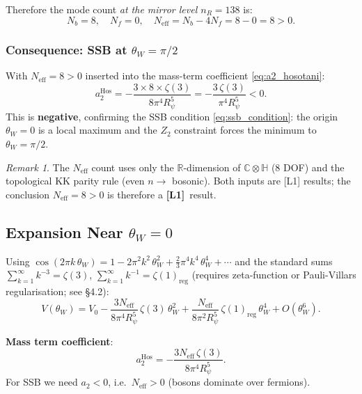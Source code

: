 \documentclass[12pt]{article}
\theoremstyle{definition}
\theoremstyle{remark}
\newtheorem{remark}[theorem]{Remark}
\newcommand{\Lone}{\textbf{[L1]}}
\begin{document}
Therefore the mode count \emph{at the mirror level $n_R = 138$} is:
\begin{equation}
  \label{eq:neff_count}
  \boxed{N_b = 8,\quad N_f = 0,\quad
  N_{\text{eff}} = N_b - 4N_f = 8 - 0 = 8 > 0.}
\end{equation}

\subsubsection{Consequence: SSB at $\theta_W = \pi/2$}

With $N_{\text{eff}} = 8 > 0$ inserted into the mass-term coefficient
\eqref{eq:a2_hosotani}:
\begin{equation}
  a_2^{\text{Hos}} = -\frac{3 \times 8 \times \zeta(3)}{8\pi^4 R_\psi^5}
                   = -\frac{3\,\zeta(3)}{\pi^4 R_\psi^5} < 0.
\end{equation}
This is \textbf{negative}, confirming the SSB condition
\eqref{eq:ssb_condition}: the origin $\theta_W = 0$ is a local
maximum and the $Z_2$ constraint forces the minimum to
$\theta_W = \pi/2$.

\begin{remark}
The $N_{\text{eff}}$ count uses only the $\mathbb{R}$-dimension of
$\mathbb{C}\otimes\mathbb{H}$ (8 DOF) and the topological KK parity
rule (even $n \to$ bosonic).  Both inputs are [L1] results;
the conclusion $N_{\text{eff}} = 8 > 0$ is therefore a \Lone\ result.
\end{remark}

\subsection{Expansion Near $\theta_W = 0$}

Using $\cos(2\pi k\,\theta_W) = 1 - 2\pi^2 k^2\,\theta_W^2
+ \tfrac{2}{3}\pi^4 k^4\,\theta_W^4 + \cdots$ and the standard sums
$\sum_{k=1}^\infty k^{-3} = \zeta(3)$,
$\sum_{k=1}^\infty k^{-1} = \zeta(1)_{\text{reg}}$ (requires
zeta-function or Pauli-Villars regularisation; see §4.2):
\begin{equation}
  V(\theta_W) = V_0
    - \frac{3N_{\text{eff}}}{8\pi^4 R_\psi^5}\,\zeta(3)\,\theta_W^2
    + \frac{N_{\text{eff}}}{8\pi^2 R_\psi^5}\,\zeta(1)_{\text{reg}}\,\theta_W^4
    + O(\theta_W^6).
\end{equation}

\noindent\textbf{Mass term coefficient}:
\begin{equation}
  \label{eq:a2_hosotani}
  a_2^{\text{Hos}} = -\frac{3N_{\text{eff}}\,\zeta(3)}{8\pi^4 R_\psi^5}.
\end{equation}
For SSB we need $a_2 < 0$, i.e.\ $N_{\text{eff}} > 0$
(bosons dominate over fermions).
\end{document}

